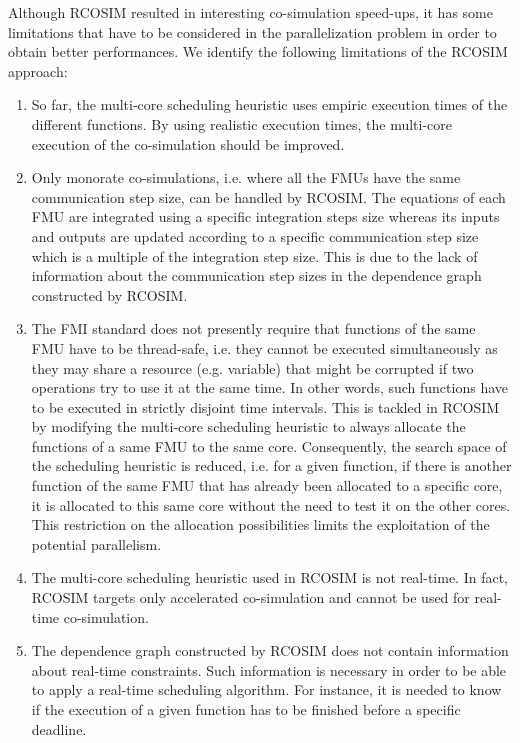 Although RCOSIM resulted in interesting co-simulation speed-ups, it has some limitations that have to be considered in the parallelization problem in order to obtain better performances. We identify the following limitations of the RCOSIM approach:

\begin{enumerate}

\item So far, the multi-core scheduling heuristic uses empiric execution times of the different functions. By using realistic execution times, the multi-core execution of the co-simulation should be improved.

\item Only monorate co-simulations, i.e. where all the FMUs have the same communication step size, can be handled by RCOSIM. The equations of each FMU are integrated using a specific integration steps size whereas its inputs and outputs are updated according to a specific communication step size which is a multiple of the integration step size. This is due to the lack of information about the communication step sizes in the dependence graph constructed by RCOSIM.

\item The FMI standard does not presently require that functions of the same FMU have to be thread-safe, i.e. they cannot be executed simultaneously as they may share a resource (e.g. variable) that might be corrupted if two operations try to use it at the same time. In other words, such functions have to be executed in strictly disjoint time intervals. This is tackled in RCOSIM by modifying the multi-core scheduling heuristic to always allocate the functions of a same FMU to the same core. Consequently, the search space of the scheduling heuristic is reduced, i.e. for a given function, if there is another function of the same FMU that has already been allocated to a specific core, it is allocated to this same core without the need to test it on the other cores. This restriction on the allocation possibilities limits the exploitation of the potential parallelism.

\item The multi-core scheduling heuristic used in RCOSIM is not real-time. In fact, RCOSIM targets only accelerated co-simulation and cannot be used for real-time co-simulation.

\item The dependence graph constructed by RCOSIM does not contain information about real-time constraints. Such information is necessary in order to be able to apply a real-time scheduling algorithm. For instance, it is needed to know if the execution of a given function has to be finished before a specific deadline.

\end{enumerate} 

